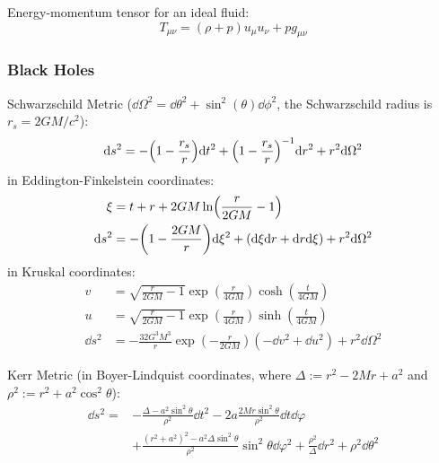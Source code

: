 			\noindent
			Energy-momentum tensor for an ideal fluid:
			\begin{equation}
				T_{\mu\nu} = (\rho + p)u_\mu u_\nu + p g_{\mu\nu}
			\end{equation}

		\subsubsection{Black Holes}
			Schwarzschild Metric ($\dd \Omega^2 = \dd \theta^2 + \sin^2(\theta) \dd \phi^2$, the Schwarzschild radius is $r_s = 2 G M/c^2$):
			\begin{equation}
				\dd s^2 = - \qty(1-\frac{r_s}{r}) \dd t^2 + \qty(1 - \frac{r_s}{r})^{-1} \dd r^2 + r^2 \dd \Omega^2
			\end{equation}
			in Eddington-Finkelstein coordinates:
			\begin{equation}
				\begin{aligned}
					\xi &= t + r + 2 G M \ln(\frac{r}{2 G M} - 1) \\
					\dd s^2 &= -\qty(1-\frac{2 G M}{r}) \dd \xi^2 + (\dd \xi \dd r + \dd r \dd \xi) + r^2\dd \Omega^2
				\end{aligned}
			\end{equation}
			in Kruskal coordinates:
			\begin{equation}
				\begin{aligned}
					v &= \sqrt{\frac{r}{2 G M} - 1} \exp(\frac{r}{4 G M}) \cosh(\frac{t}{4 G M}) \\
					u &= \sqrt{\frac{r}{2 G M} - 1} \exp(\frac{r}{4 G M}) \sinh(\frac{t}{4 G M}) \\
					\dd s^2 &= -\frac{32 G^3 M^3}{r} \exp(-\frac{r}{2 G M}) (-\dd v^2 + \dd u^2) + r^2 \dd \Omega^2
				\end{aligned}
			\end{equation}

			\noindent
			Kerr Metric (in Boyer-Lindquist coordinates, where $\Delta:=r^2 - 2Mr + a^2$ and $\rho^2:=r^2+a^2\cos^2\theta$):
			\begin{equation}
				\begin{aligned}
					\dd s^2 =& - \frac{\Delta - a^2 \sin^2\theta}{\rho^2} \dd t^2 - 2a\frac{2Mr\sin^2\theta}{\rho^2}\dd t \dd \varphi \\
					&+ \frac{(r^2+a^2)^2 - a^2\Delta \sin^2\theta}{\rho^2}\sin^2\theta\dd\varphi^2 + \frac{\rho^2}{\Delta}\dd r^2 + \rho^2\dd\theta^2
				\end{aligned}
			\end{equation}

